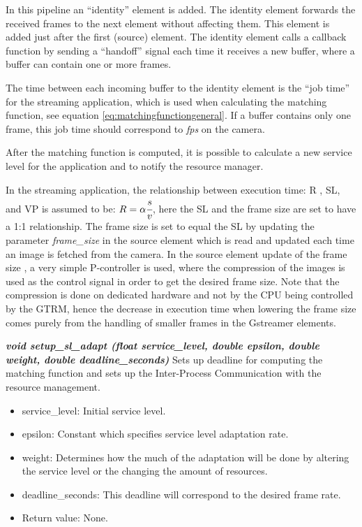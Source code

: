 \documentclass[nobiblatex]{LTHthesis}
\begin{document}
In this pipeline an ``identity'' element is added. The identity element
forwards the received frames to the next element without affecting them.
This element is added just after the first (source) element.
The identity element calls a callback function by sending a ``handoff'' 
signal each time it receives a new buffer, where a buffer can contain one or 
more frames.

The time between each incoming buffer to the identity element is the 
``job time'' for the streaming application, which is used when calculating the 
matching function, see equation \ref{eq:matchingfunctiongeneral}. 
If a buffer contains only one frame, this job time should correspond to 
\emph{fps} on the camera.

After the matching function is computed, it is possible to calculate a new
service level for the application and to notify the resource manager. 


In the streaming application, the relationship between execution time: R , SL, and VP is assumed to be:
$R=\alpha \cfrac{s}{v}$, here the SL and the frame size are set to have a 1:1 relationship.
The frame size is set to equal the SL by updating the parameter \emph{frame\_size}  in the source element which is read and updated
each time an image is fetched from the camera. In the  source element update of the frame size , a very simple P-controller is used, where 
the compression of the images is used as the control signal in order to get the desired frame size. 
Note that the compression is done on dedicated hardware and not by the CPU being controlled by the GTRM, hence the decrease in execution time when lowering
the frame size comes purely from the handling of smaller frames in the Gstreamer elements.





\begin{framed}
	\begin{flushleft}	
		\emph{\textbf{{void setup\_sl\_adapt \newline
	(float service\_level, double epsilon, double weight, double deadline\_seconds)}}} \newline
		Sets up deadline for computing the matching function and sets up the 
	Inter-Process Communication with the resource management.
		\begin{itemize}
		\item service\_level: Initial service level.
		\item epsilon: Constant which specifies service level adaptation rate.
		\item weight: Determines how the much of the adaptation will be done 
      by altering the service level or the changing the amount of resources.
		\item deadline\_seconds: This deadline will correspond to the desired frame rate.
		\item Return value: None.
	\end{itemize}
	\end{flushleft}
\end{framed}
\end{document}
